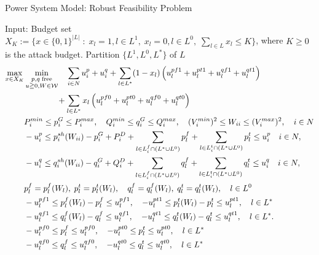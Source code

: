 \documentclass[xcolor=dvipsnames]{beamer}
\newcommand{\p}[1]{p^{#1}}
\newcommand{\q}[1]{q^{#1}}
\newcommand{\ii}{i}
\newcommand{\llll}{l}
\newcommand{\from}{f}
\newcommand{\tto}{t}
\newcommand{\WW}{W}
\newcommand{\WSet}{\mathcal{W}}
\newcommand{\Lines}{L}
\begin{document}
\begin{frame}{Power System Model: Robust Feasibility Problem}
\begin{footnotesize}
Input: Budget set $X_K:=\{ x \in \{0,1\}^{|L|}\; : \; x_l=1, l \in L^1,\; x_l=0, l \in L^0,\; \sum_{l \in L} x_l \le K\}$, where $K\ge 0$ is the attack budget. Partition $\{ L^1,L^0,L^* \}$ of $L$
\begin{subequations}
\begin{align}
\max_{x \in X_K} &\min_{\substack{p,q\;\text{free}\\ u \geqq 0,W\in \WSet}} \quad 
 \sum_{i \in N} u_i^p + u_i^q + \sum_{l \in L^*} (1-x_l)\left( u_l^{pf1} + u_l^{pt1} + u_l^{qf1} + u_l^{qt1} \right) \notag \\
&\qquad\qquad+ \sum_{l \in L^*} x_l\left( u_l^{pf0} + u_l^{pt0} + u_l^{qf0} + u_l^{qt0} \right)  \notag \\
  & P_i^{min} \leq p_i^G \leq P_i^{max}, \quad Q_i^{min} \leq q_i^G \leq Q_i^{max}, \quad (V_i^{min})^2 \leq W_{ii} \leq (V_i^{max})^2,\quad i\in N \notag \\
  & -u_i^p \le p_i^{sh}(\WW_{ii}) - p^G_i + P^D_i 
	+ \sum_{\llll \in \Lines_\ii^{\from} \cap (L^* \cup L^0)  } p_{l}^{f}  
	+\sum_{\llll \in \Lines_\ii^{\tto} \cap (L^* \cup L^0) } p_{l}^{t} 
	\le u_i^p \quad i\in N, \notag\\ 
  & -u_i^q \le q_i^{sh}(\WW_{ii}) - q^G_i + Q^D_i 
	+ \sum_{\llll \in \Lines_\ii^{\from} \cap (L^* \cup L^0) } q_{l}^{f}
	+ \sum_{\llll \in \Lines_\ii^{\tto} \cap (L^* \cup L^0) } q_{l}^{t} 
	\le u_i^q \quad i\in N, \notag \\
& p_{l}^{f}=\p{\from}_{\llll}(\WW_\llll),\; p_l^t=\p{\tto}_{\llll}(\WW_\llll),\quad q_l^f=\q{\from}_{\llll}(\WW_\llll),\; q_l^t=\q{\tto}_{\llll}(\WW_\llll) , \quad \llll \in L^0 \notag \\
& -u_l^{pf1} \le \p{\from}_{\llll}(\WW_\llll) - p_{l}^{f} \le u_l^{pf1}, \quad
 -u_l^{pt1} \le \p{\tto}_{\llll}(\WW_\llll)  - p_{l}^{t} \le u_l^{pt1}, \quad \llll \in L^* \notag \\
& -u_l^{qf1} \le \q{\from}_{\llll}(\WW_\llll) - q_{l}^{f} \le u_l^{qf1}, \quad 
 -u_l^{qt1} \le \q{\tto}_{\llll}(\WW_\llll)  - q_{l}^{t} \le u_l^{qt1}, \quad \llll \in L^*. \notag \\
& -u_l^{pf0} \le p_l^f \le u_l^{pf0},\quad-u_l^{pt0} \le p_l^t \le u_l^{pt0}, \quad l \in L^* \notag\\ 
& -u_l^{qf0} \le q_l^f \le u_l^{qf0},\quad-u_l^{qt0} \le q_l^t \le u_l^{qt0}, \quad l \in L^* \notag
\end{align}
\end{subequations}
\end{footnotesize}
\end{frame}
\end{document}
